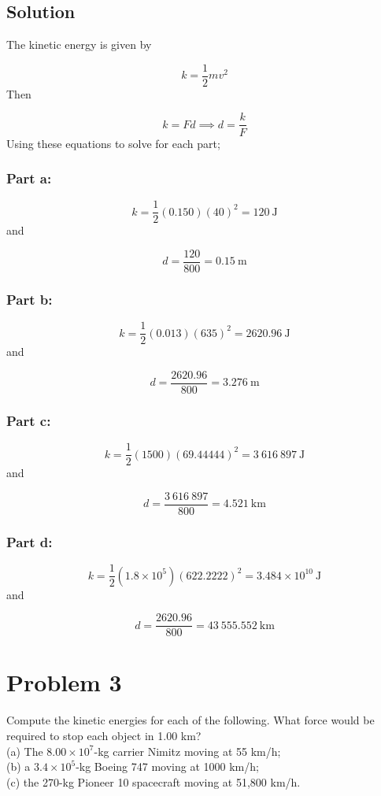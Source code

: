 \documentclass{article}
\begin{document}
\subsection*{Solution}
The kinetic energy is given by

\begin{equation}
	k = \frac{1}{2}mv^2
\end{equation}
Then

\[
	k = Fd \implies d = \frac{k}{F}
\]
Using these equations to solve for each part;
\subsubsection*{Part a:}
\[
	k = \frac{1}{2} (0.150)(40)^2 = \boxed{120\ \text{J}}
\]
and

\[
	d = \frac{120}{800} = \boxed{0.15\ \text{m}}
\]

\subsubsection*{Part b:}
\[
	k = \frac{1}{2} (0.013)(635)^2 = \boxed{2620.96\ \text{J}}
\]
and

\[
	d = \frac{2620.96}{800} = \boxed{3.276\ \text{m}}
\]

\subsubsection*{Part c:}
\[
	k = \frac{1}{2} (1500)(69.44444)^2 = \boxed{3\ 616\ 897\ \text{J}}
\]
and

\[
	d = \frac{3\ 616\ 897}{800} = \boxed{4.521\ \text{km}}
\]

\subsubsection*{Part d:}
\[
	k = \frac{1}{2} (1.8 \times 10^5)(622.2222)^2 = \boxed{3.484\times10^{10}\ \text{J}}
\]
and

\[
	d = \frac{2620.96}{800} = \boxed{43\ 555.552\ \text{km}}
\]


\section*{Problem 3}
Compute the kinetic energies for each of the following. What force would be required to stop each object in
1.00 km? \\
(a) The $8.00 \times 10^7$-kg carrier Nimitz moving at 55 km/h; \\
(b) a $3.4 \times 10^5$-kg Boeing 747 moving at 1000 km/h; \\
(c) the 270-kg Pioneer 10 spacecraft moving at 51,800 km/h.
\end{document}

